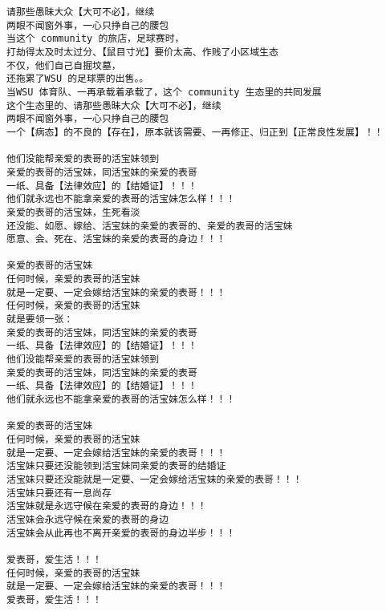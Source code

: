 \documentclass[9pt, b5paper]{article}
\begin{document}
\begin{verbatim}
请那些愚昧大众【大可不必】，继续
两眼不闻窗外事，一心只挣自己的腰包
当这个 community 的旅店，足球赛时，
打劫得太及时太过分、【鼠目寸光】要价太高、作贱了小区域生态
不仅，他们自己自掘坟墓，
还拖累了WSU 的足球票的出售。。
当WSU 体育队、一再承载着承载了，这个 community 生态里的共同发展
这个生态里的、请那些愚昧大众【大可不必】，继续
两眼不闻窗外事，一心只挣自己的腰包
一个【病态】的不良的【存在】，原本就该需要、一再修正、归正到【正常良性发展】！！

他们没能帮亲爱的表哥的活宝妹领到
亲爱的表哥的活宝妹，同活宝妹的亲爱的表哥
一纸、具备【法律效应】的【结婚证】！！！
他们就永远也不能拿亲爱的表哥的活宝妹怎么样！！！
亲爱的表哥的活宝妹，生死看淡
还没能、如愿、嫁给、活宝妹的亲爱的表哥的、亲爱的表哥的活宝妹
愿意、会、死在、活宝妹的亲爱的表哥的身边！！！

亲爱的表哥的活宝妹
任何时候，亲爱的表哥的活宝妹
就是一定要、一定会嫁给活宝妹的亲爱的表哥！！！
任何时候，亲爱的表哥的活宝妹
就是要领一张：
亲爱的表哥的活宝妹，同活宝妹的亲爱的表哥
一纸、具备【法律效应】的【结婚证】！！！
他们没能帮亲爱的表哥的活宝妹领到
亲爱的表哥的活宝妹，同活宝妹的亲爱的表哥
一纸、具备【法律效应】的【结婚证】！！！
他们就永远也不能拿亲爱的表哥的活宝妹怎么样！！！

亲爱的表哥的活宝妹
任何时候，亲爱的表哥的活宝妹
就是一定要、一定会嫁给活宝妹的亲爱的表哥！！！
活宝妹只要还没能领到活宝妹同亲爱的表哥的结婚证
活宝妹只要还没能就是一定要、一定会嫁给活宝妹的亲爱的表哥！！！
活宝妹只要还有一息尚存
活宝妹就是永远守候在亲爱的表哥的身边！！！
活宝妹会永远守候在亲爱的表哥的身边
活宝妹会从此再也不离开亲爱的表哥的身边半步！！！

爱表哥，爱生活！！！
任何时候，亲爱的表哥的活宝妹
就是一定要、一定会嫁给活宝妹的亲爱的表哥！！！
爱表哥，爱生活！！！
\end{verbatim}
\end{document}

